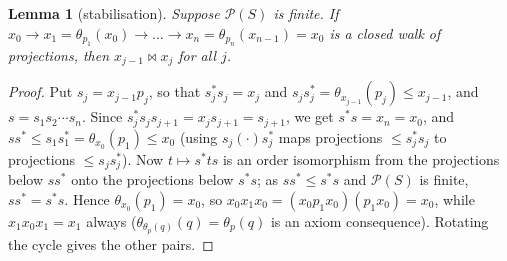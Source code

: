 \documentclass[11pt]{amsart}
\newtheorem{lemma}[theorem]{Lemma}
\theoremstyle{definition}
\renewcommand{\P}{\mathcal{P}}
\newcommand{\mt}{\bowtie}   %
\begin{document}
\begin{lemma}[stabilisation]\label{lem:stab}
Suppose $\P(S)$ is finite. If $x_0\to x_1=\theta_{p_1}(x_0)\to\dots\to x_n=\theta_{p_n}(x_{n-1})=x_0$ is a closed walk of projections, then $x_{j-1}\mt x_j$ for all $j$.
\end{lemma}
\begin{proof}
Put $s_j=x_{j-1}p_j$, so that $s_j^*s_j=x_j$ and $s_js_j^*=\theta_{x_{j-1}}(p_j)\le x_{j-1}$, and $s=s_1s_2\cdots s_n$. Since $s_j^*s_js_{j+1}=x_js_{j+1}=s_{j+1}$, we get $s^*s=x_n=x_0$, and $ss^*\le s_1s_1^*=\theta_{x_0}(p_1)\le x_0$ (using $s_j(\cdot)s_j^*$ maps projections $\le s_j^*s_j$ to projections $\le s_js_j^*$). Now $t\mapsto s^*ts$ is an order isomorphism from the projections below $ss^*$ onto the projections below $s^*s$; as $ss^*\le s^*s$ and $\P(S)$ is finite, $ss^*=s^*s$. Hence $\theta_{x_0}(p_1)=x_0$, so $x_0x_1x_0=(x_0p_1x_0)(p_1x_0)=x_0$, while $x_1x_0x_1=x_1$ always ($\theta_{\theta_p(q)}(q)=\theta_p(q)$ is an axiom consequence). Rotating the cycle gives the other pairs.
\end{proof}
\end{document}
